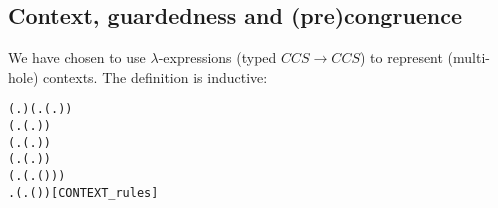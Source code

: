 
\subsection{Context, guardedness and (pre)congruence}


We have chosen to use $\lambda$-expressions (typed
$CCS\rightarrow CCS$) to represent  (multi-hole) 
contexts. The definition is inductive:
\begin{alltt}
\HOLTokenTurnstile{}  (\HOLTokenLambda{}. ) \HOLSymConst{\HOLTokenConj{}} (\HOLSymConst{\HOLTokenForall{}}.  (\HOLTokenLambda{}. )) \HOLSymConst{\HOLTokenConj{}}
   (\HOLSymConst{\HOLTokenForall{}} .   \HOLSymConst{\HOLTokenImp{}}  (\HOLTokenLambda{}.  )) \HOLSymConst{\HOLTokenConj{}}
   (\HOLSymConst{\HOLTokenForall{}} .   \HOLSymConst{\HOLTokenConj{}}   \HOLSymConst{\HOLTokenImp{}}  (\HOLTokenLambda{}.   \HOLSymConst{+}  )) \HOLSymConst{\HOLTokenConj{}}
   (\HOLSymConst{\HOLTokenForall{}} .   \HOLSymConst{\HOLTokenConj{}}   \HOLSymConst{\HOLTokenImp{}}  (\HOLTokenLambda{}.   \HOLSymConst{\ensuremath{\parallel}}  )) \HOLSymConst{\HOLTokenConj{}}
   (\HOLSymConst{\HOLTokenForall{}} .   \HOLSymConst{\HOLTokenImp{}}  (\HOLTokenLambda{}. \HOLSymConst{\ensuremath{\nu}}  ( ))) \HOLSymConst{\HOLTokenConj{}}
   \HOLSymConst{\HOLTokenForall{}} .   \HOLSymConst{\HOLTokenImp{}}  (\HOLTokenLambda{}.  ( ) )\hfill{[CONTEXT_rules]}
\end{alltt}
